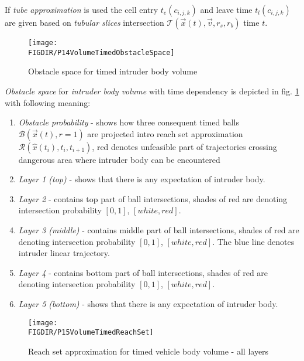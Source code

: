 If \emph{tube approximation} is used the cell entry $t_e(c_{i,j,k})$ and leave time $t_l(c_{i,j,k})$ are given based on \emph{tubular slices} intersection $\mathscr{T}(\vec{x}(t),\vec{v},r_s,r_b)$ time $t$.

\begin{figure}[H]
    \centering
    \texttt{[image: \\FIGDIR/P14VolumeTimedObstacleSpace]}
    \caption{Obstacle space for timed intruder body volume}
    \label{fig:P14VolumeTimedObstacleSpace}
\end{figure}
\emph{Obstacle space} for \emph{intruder body volume} with time dependency is depicted in fig. \ref{fig:P14VolumeTimedObstacleSpace} with following meaning:
\begin{enumerate}
    \item\emph{Obstacle probability} - shows how three consequent timed balls $\mathscr{B}(\vec{x}(t),r=1)$ are projected intro reach set approximation $\mathscr{R}(\hat{x}(t_i),t_i,t_{i+1})$, red denotes unfeasible part of trajectories crossing dangerous area where intruder body can be encountered
    \item\emph{Layer 1 (top)} - shows that there is any expectation of intruder body.
    \item\emph{Layer 2} - contains top part of ball intersections, shades of red are denoting intersection probability $[0,1]$, $[white,red]$.
    \item\emph{Layer 3 (middle)} - contains middle part of ball intersections, shades of red are denoting intersection probability $[0,1]$, $[white,red]$. The blue line denotes intruder linear trajectory. 
    \item\emph{Layer 4} - contains bottom part of ball intersections, shades of red are denoting intersection probability $[0,1]$, $[white,red]$.
    \item\emph{Layer 5 (bottom)} - shows that there is any expectation of intruder body.
\end{enumerate}

\begin{figure}[H]
    \centering
    \texttt{[image: \\FIGDIR/P15VolumeTimedReachSet]}
    \caption{Reach set approximation for timed vehicle body volume - all layers}
    \label{fig:P15VolumeTimedReachSet}
\end{figure}

